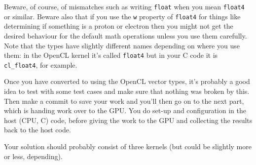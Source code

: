 \documentclass[letterpaper,10pt]{article}
\newcommand{\Rplus}{\protect\hspace{-.1em}\protect\raisebox{.35ex}{\smaller{\smaller\textbf{+}}}}
\newcommand{\Cpp}{\mbox{C\Rplus\Rplus}\xspace}
\begin{document}
Beware, of course, of mismatches such as writing \texttt{float} when you mean 
\texttt{float4} or similar. Beware also that if you use the \texttt{w} property 
of \texttt{float4} for things like determining if something is a proton or electron 
then you might not get the desired behaviour for the default math operations unless
you use them carefully. 
Note that the types have slightly different names 
depending on where you use them: in the OpenCL kernel it's called
\texttt{float4} but in your \Cpp code it is \texttt{cl\_float4}, for example. 

Once you have converted to using the OpenCL vector types, it's probably a good idea 
to test with some test cases and make sure that nothing was broken by this. Then make 
a commit to save your work and you'll then go on to the next part, which is handing 
work over to the GPU. You do set-up and configuration in the host (CPU, \Cpp) code, before giving the work to the GPU and collecting the results back to the host code.



Your solution should probably consist of three kernels (but could be slightly more or less, depending).
\end{document}
